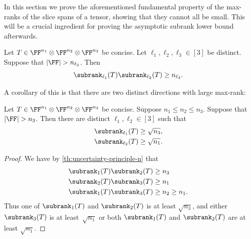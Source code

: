 %

%

%

In this section we prove the aforementioned fundamental property of the max-ranks of the slice spans of a tensor, showing that they cannot all be small. This will be a crucial ingredient for proving the asymptotic subrank lower bound afterwards.

\begin{theorem}\label{th:uncertainty-principle-n}
    Let $T \in \FF^{n_1} \otimes \FF^{n_2} \otimes \FF^{n_3}$ be concise. Let ${\ell_1}, {\ell_2}, {\ell_3} \in [3]$ be distinct. Suppose that $|\FF|>n_{\ell_3}$. Then 
    \[
    \subrank_{\ell_1}(T)\subrank_{\ell_2}(T) \geq n_{\ell_3}.
    \]
\end{theorem}

%

%

%

A corollary of this is that there are two distinct directions with large max-rank:

\begin{corollary} %
\label{cor:twoLargeRankDirs}
    Let $T\in\FF^{n_1}\otimes\FF^{n_2}\otimes\FF^{n_3}$ be concise.
    Suppose $n_1 \leq n_2 \leq n_3$. Suppose that $|\FF| > n_3$. 
    Then there are distinct ${\ell_1},{\ell_2}\in[3]$ such that
    \begin{align*}\subrank_{\ell_1}(T) &\geq \sqrt{n_3},\\
    \subrank_{\ell_2}(T) &\geq \sqrt{n_1}.
    \end{align*}
\end{corollary}
%
\begin{proof}%
    We have by \autoref{th:uncertainty-principle-n} that
    \begin{align*}
    \subrank_1(T) \subrank_2(T) &\geq n_3\\
    \subrank_2(T) \subrank_3(T) &\geq n_1\\
    \subrank_1(T) \subrank_3(T) &\geq n_2 \geq n_1.
    \end{align*}
    Thus one of $\subrank_1(T)$ and $\subrank_2(T)$ is at least $\sqrt{n_3}$, and either $\subrank_3(T)$ is at least~$\sqrt{n_1}$ or both $\subrank_1(T)$ and $\subrank_2(T)$ are at least $\sqrt{n_1}$.
\end{proof}
